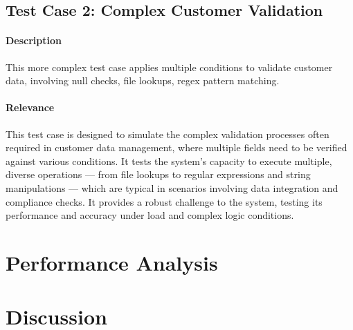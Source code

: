 \subsection{Test Case 2: Complex Customer Validation}

\paragraph{Description} This more complex test case applies multiple conditions to validate customer data, involving null checks, file lookups, regex pattern matching.

\paragraph{Relevance} This test case is designed to simulate the complex validation processes often required in customer data management, where multiple fields need to be verified against various conditions. It tests the system’s capacity to execute multiple, diverse operations — from file lookups to regular expressions and string manipulations — which are typical in scenarios involving data integration and compliance checks. It provides a robust challenge to the system, testing its performance and accuracy under load and complex logic conditions.


\section{Performance Analysis}



\section{Discussion}


